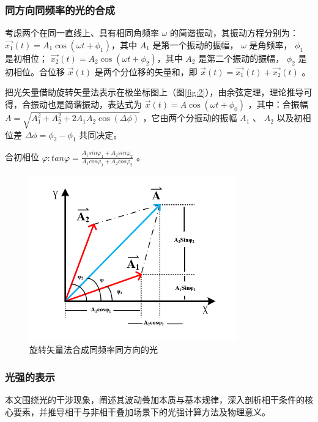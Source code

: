 \documentclass[withoutpreface,bwprint]{cumcmthesis} %
\begin{document}
\subsubsection{同方向同频率的光的合成}
考虑两个在同一直线上、具有相同角频率 $\omega$ 的简谐振动，其振动方程分别为：
$ \overrightarrow{x_1}(t) = A_1 \cos(\omega t + \phi_{1})$，其中 $A_1$ 是第一个振动的振幅， $\omega$ 是角频率， $\phi_{1}$ 是初相位；
$\overrightarrow{x_2}(t) = A_2 \cos(\omega t + \phi_{2})$，其中 $A_2$ 是第二个振动的振幅， $\phi_{2}$ 是初相位。合位移 $\overrightarrow{x}(t)$ 是两个分位移的矢量和，即 $\overrightarrow{x}(t) = \overrightarrow{x_1}(t) + \overrightarrow{x_2}(t)$ 。

把光矢量借助旋转矢量法表示在极坐标图上（图\eqref{fig:2}），由余弦定理，理论推导可得，合振动也是简谐振动，表达式为 $\overrightarrow{x}(t) = A \cos(\omega t + \phi_0)$ ，其中：合振幅 $A = \sqrt{A_1^2 + A_2^2 + 2 A_1 A_2 \cos(\Delta \phi)}$ ，它由两个分振动的振幅 $A_1$ 、 $A_2$ 以及初相位差 $\Delta \phi = \phi_{2} - \phi_{1}$ 共同决定。

合初相位 \(\varphi:tan\varphi = \frac{A_{1}sin\varphi_{1} + A_{2}sin\varphi_{2}}{A_{1}cos\varphi_{1} + A_{2}cos\varphi_{2}}\) 。

\begin{figure}[!h]
    \centering
    \includegraphics[width=0.8\textwidth]{figures/figure2.png}
    \caption{旋转矢量法合成同频率同方向的光}
    \label{fig:2}
\end{figure}

\subsubsection{光强的表示}
本文围绕光的干涉现象，阐述其波动叠加本质与基本规律，深入剖析相干条件的核心要素，并推导相干与非相干叠加场景下的光强计算方法及物理意义。
\end{document}

